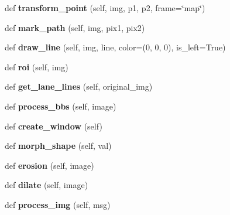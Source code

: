 \begin{DoxyCompactItemize}
\item 
\mbox{\label{classcrop__detector_1_1CropDetector_a55c2161487204b06fce7ad579d164228}} 
def {\bfseries transform\+\_\+point} (self, img, p1, p2, frame=\char`\"{}map\char`\"{})
\item 
\mbox{\label{classcrop__detector_1_1CropDetector_aa17f73f7a41004d96ae95792c27b1f9a}} 
def {\bfseries mark\+\_\+path} (self, img, pix1, pix2)
\item 
\mbox{\label{classcrop__detector_1_1CropDetector_a78381a2a2b8cab0eb9d18d7230bda686}} 
def {\bfseries draw\+\_\+line} (self, img, line, color=(0, 0, 0), is\+\_\+left=True)
\item 
\mbox{\label{classcrop__detector_1_1CropDetector_a4f1bf1f40f09692e30938e8e0c91142a}} 
def {\bfseries roi} (self, img)
\item 
\mbox{\label{classcrop__detector_1_1CropDetector_a52f7186ec4fed41626dfcef539be3357}} 
def {\bfseries get\+\_\+lane\+\_\+lines} (self, original\+\_\+img)
\item 
\mbox{\label{classcrop__detector_1_1CropDetector_a8d10dc2fbfe92c09aadf71913e40e497}} 
def {\bfseries process\+\_\+bbs} (self, image)
\item 
\mbox{\label{classcrop__detector_1_1CropDetector_a3f6e192c41570278d5f31dc1f0a9995c}} 
def {\bfseries create\+\_\+window} (self)
\item 
\mbox{\label{classcrop__detector_1_1CropDetector_afba7aaaf031cc75dda12d9df13bcbdbf}} 
def {\bfseries morph\+\_\+shape} (self, val)
\item 
\mbox{\label{classcrop__detector_1_1CropDetector_a5fd7e82ed84aaef8539c519cf6c86525}} 
def {\bfseries erosion} (self, image)
\item 
\mbox{\label{classcrop__detector_1_1CropDetector_ae72a096b99d0b732dd8bb67b1fc36467}} 
def {\bfseries dilate} (self, image)
\item 
\mbox{\label{classcrop__detector_1_1CropDetector_ac7df0a69abfcd9642d74a2af5d0171ee}} 
def {\bfseries process\+\_\+img} (self, msg)
\end{DoxyCompactItemize}
